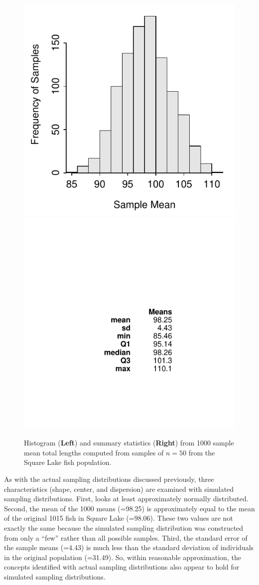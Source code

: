 \documentclass[10pt,openany]{book}\usepackage[]{graphicx}\usepackage[]{color}
\newenvironment{knitrout}{}{} %
\begin{document}
\begin{knitrout}
\color{fgcolor}\begin{figure}[hbtp]

{\centering \includegraphics[width=.33\linewidth]{Figs/SampDistSLMean50-1} 
\includegraphics[width=.33\linewidth]{Figs/SampDistSLMean50-2} 

}

\caption[Histogram (\textbf{Left}) and summary statistics (\textbf{Right}) from 1000 sample mean total lengths computed from samples of $n=50$ from the Square Lake fish population]{Histogram (\textbf{Left}) and summary statistics (\textbf{Right}) from 1000 sample mean total lengths computed from samples of $n=50$ from the Square Lake fish population.}\label{fig:SampDistSLMean50}
\end{figure}


\end{knitrout}

As with the actual sampling distributions discussed previously, three characteristics (shape, center, and dispersion) are examined with simulated sampling distributions. First,  looks at least approximately normally distributed. Second, the mean of the 1000 means (=98.25) is approximately equal to the mean of the original 1015 fish in Square Lake (=98.06). These two values are not exactly the same because the simulated sampling distribution was constructed from only a ``few'' rather than all possible samples. Third, the standard error of the sample means (=4.43) is much less than the standard deviation of individuals in the original population (=31.49). So, within reasonable approximation, the concepts identified with actual sampling distributions also appear to hold for simulated sampling distributions.
\end{document}
